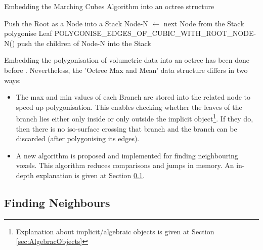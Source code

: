 \documentclass{subfiles}
\begin{document}
\begin{algorithm}[!htbp]
	\caption{Embedding the Marching Cubes Algorithm into an octree structure}
	\label{alg:MCOctree}
	\centering
	\begin{algorithmic}[1]
		\State Push the Root as a Node into a Stack
		\State Node-N   $\gets$  next Node from the Stack 
		\State polygonise Leaf
		\State	POLYGONISE\_EDGES\_OF\_CUBIC\_WITH\_ROOT\_NODE-N()	
		\Else
		\State push the children of Node-N into the Stack
		\EndIf
		\EndWhile
	\end{algorithmic}
\end{algorithm}




\par Embedding the polygonisation of volumetric data into an octree has been done before \cite{Wilhelms1990}. Nevertheless, the 'Octree Max and Mean' data structure differs in two ways:
\begin{itemize}
	\item The max and min values of each Branch are stored into the related node to speed up polygonisation. This enables checking whether the leaves of the branch lies either only inside or only outside the implicit object{\footnote{Explanation about implicit/algebraic objects is given at Section \ref{sec:AlgebracObjects}}}. If they do, then there is no iso-surface crossing that branch and the branch can be discarded (after polygonising its edges).
    \item A new algorithm is proposed and implemented for finding neighbouring voxels. This algorithm reduces comparisons and jumps in memory. An in-depth explanation is given at Section \ref{sec:NeighboursFinding}.
\end{itemize}





\subsection{Finding Neighbours}\label{sec:NeighboursFinding}
\end{document}
